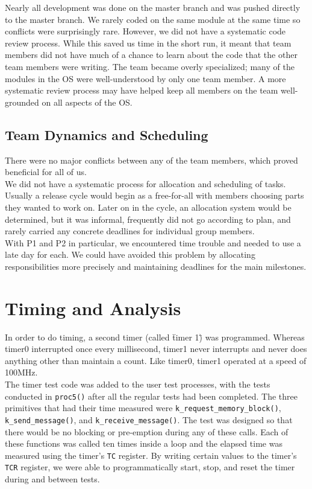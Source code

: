 \documentclass[12pt]{report}
\begin{document}
Nearly all development was done on the master branch and was pushed directly to the master branch. We rarely coded on the same module at the same time so conflicts were surprisingly rare. However, we did not have a systematic code review process. While this saved us time in the short run, it meant that team members did not have much of a chance to learn about the code that the other team members were writing. The team became overly specialized; many of the modules in the OS were well-understood by only one team member. A more systematic review process may have helped keep all members on the team well-grounded on all aspects of the OS.\\

\section{Team Dynamics and Scheduling}

There were no major conflicts between any of the team members, which proved beneficial for all of us.\\

We did not have a systematic process for allocation and scheduling of tasks. Usually a release cycle would begin as a free-for-all with members choosing parts they wanted to work on. Later on in the cycle, an allocation system would be determined, but it was informal, frequently did not go according to plan, and rarely carried any concrete deadlines for individual group members.\\

With P1 and P2 in particular, we encountered time trouble and needed to use a late day for each. We could have avoided this problem by allocating responsibilities more precisely and maintaining deadlines for the main milestones.\\

\chapter{Timing and Analysis}

In order to do timing, a second timer (called \"timer 1\") was programmed. Whereas timer0 interrupted once every millisecond, timer1 never interrupts and never does anything other than maintain a count. Like timer0, timer1 operated at a speed of 100MHz.\\

The timer test code was added to the user test processes, with the tests conducted in {\tt proc5()} after all the regular tests had been completed. The three primitives that had their time measured were {\tt k\_request\_memory\_block()}, {\tt k\_send\_message()}, and {\tt k\_receive\_message()}. The test was designed so that there would be no blocking or pre-emption during any of these calls. Each of these functions was called ten times inside a loop and the elapsed time was measured using the timer's {\tt TC} register. By writing certain values to the timer's {\tt TCR} register, we were able to programmatically start, stop, and reset the timer during and between tests.\\
\end{document}
